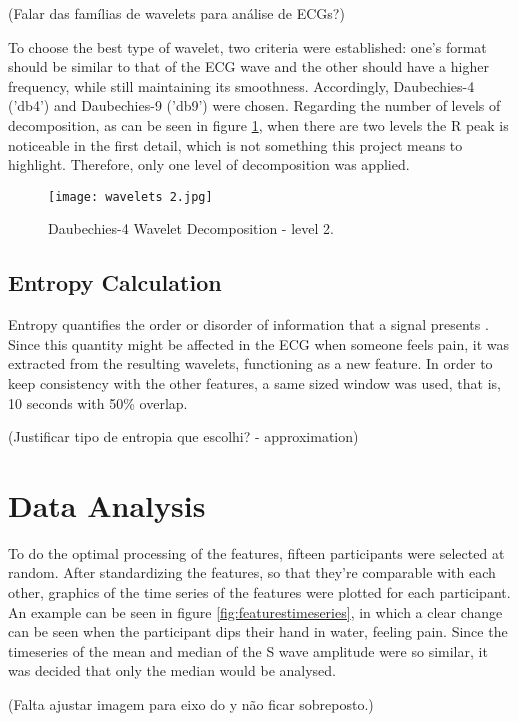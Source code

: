 (Falar das famílias de wavelets para análise de ECGs?)

To choose the best type of wavelet, two criteria were established: one's format should be similar to that of the ECG wave and the other should have a higher frequency, while still maintaining its smoothness.
Accordingly, Daubechies-4 ('db4') and Daubechies-9 ('db9') were chosen.
Regarding the number of levels of decomposition, as can be seen in figure \ref{fig:wavelets2}, when there are two levels the R peak is noticeable in the first detail, which is not something this project means to highlight.
Therefore, only one level of decomposition was applied.

\begin{figure}[h!]
    \centering
    \texttt{[image: wavelets 2.jpg]}
    \caption{Daubechies-4 Wavelet Decomposition - level 2.}
    \label{fig:wavelets2}
\end{figure}


\subsection{Entropy Calculation}
Entropy quantifies the order or disorder of information that a signal presents \cite{Ferreira2017}. Since this quantity might be affected in the ECG when someone feels pain, it was extracted from the resulting wavelets, functioning as a new feature. In order to keep consistency with the other features, a same sized window was used, that is, 10 seconds with 50\% overlap. 

(Justificar tipo de entropia que escolhi? - approximation)






\section{Data Analysis}
To do the optimal processing of the features, fifteen participants were selected at random. After standardizing the features, so that they're comparable with each other, graphics of the time series of the features were plotted for each participant. An example can be seen in figure \ref{fig:featurestimeseries}, in which a clear change can be seen when the participant dips their hand in water, feeling pain. Since the timeseries of the mean and median of the S wave amplitude were so similar, it was decided that only the median would be analysed.

(Falta ajustar imagem para eixo do y não ficar sobreposto.)

